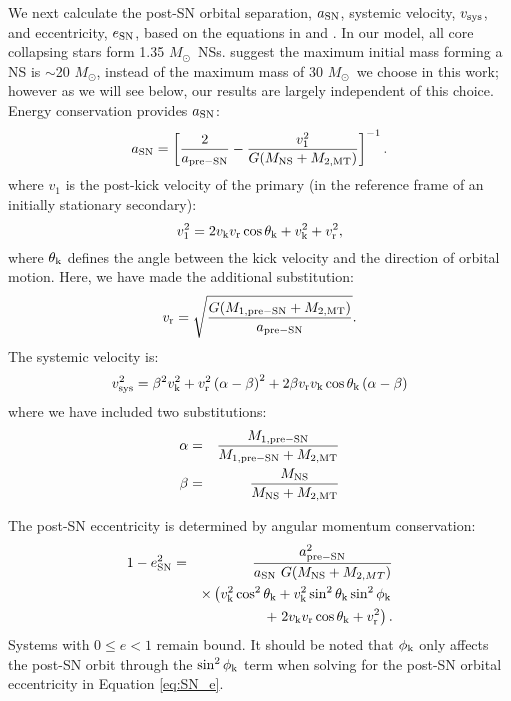 \documentclass[usenatbib]{mnras}
\newcommand{\Msun}{\ifmmode {M_{\odot}}\else${M_{\odot}}$\fi}
\begin{document}
We next calculate the post-SN orbital separation, $a_{\rm SN}$, systemic velocity, $v_{\rm sys}$, and eccentricity, $e_{\rm SN}$, based on the equations in \citet{hills83} and \citet{kalogera96}. In our model, all core collapsing stars form 1.35 \Msun\ NSs. \citet{timmes96} suggest the maximum initial mass forming a NS is $\sim$20 \Msun, instead of the maximum mass of 30 \Msun\ we choose in this work; however as we will see below, our results are largely independent of this choice. Energy conservation provides $a_{\rm SN}$:
\begin{equation}
a_{\rm SN} = \left[ \frac{2 }{a_{\rm pre-SN}}  - \frac{v_1^2}{G(M_{\rm NS} + M_{\rm 2, MT})} \right]^{-1}. \label{eq:SN_A} \\
\end{equation}
where $v_1$ is the post-kick velocity of the primary (in the reference frame of an initially stationary secondary):
\begin{equation}
v_1^2 = 2v_{\rm k} v_{\rm r} \cos \theta_{\rm k} + v_{\rm k}^2 + v_{\rm r}^2, \label{eq:v_1}
\end{equation}
where $\theta_{\rm k}$ defines the angle between the kick velocity and the direction of orbital motion. Here, we have made the additional substitution:
\begin{equation}
v_{\rm r} = \sqrt{\frac{G (M_{\rm 1, pre-SN} + M_{\rm 2, MT})}{a_{\rm pre-SN}}}. \label{eq:v_r}
\end{equation}
The systemic velocity is:
\begin{equation}
v_{\rm sys}^2 = \beta^2 v_{\rm k}^2
   + v_{\rm r}^2 \left( \alpha - \beta \right)^2
   + 2 \beta v_{\rm r} v_{\rm k} \cos \theta_{\rm k} \left( \alpha - \beta \right)
    \label{eq:SN_v_sys}
\end{equation}
where we have included two substitutions:
\begin{eqnarray}
\alpha &=& \frac{M_{\rm 1, pre-SN}}{M_{\rm 1, pre-SN} + M_{\rm 2, MT}} \\
\beta &=& \frac{M_{\rm NS}}{M_{\rm NS} + M_{\rm 2, MT}}
\end{eqnarray}


The post-SN eccentricity is determined by angular momentum conservation:
\begin{eqnarray}
1-e_{\rm SN}^2 &=& \frac{a_{\rm pre-SN}^2}{a_{\rm SN}\ G (M_{\rm NS} + M_{2, MT})} \nonumber \\
 & & \times \left( v_{\rm k}^2 \cos^2\theta_{\rm k} + v_{\rm k}^2 \sin^2 \theta_{\rm k} \sin^2 \phi_{\rm k} \right. \nonumber \\
 & & \qquad + \left. 2 v_{\rm k} v_{\rm r} \cos \theta_{\rm k} + v_{\rm r}^2  \right). \label{eq:SN_e}
\end{eqnarray}
Systems with $0 \leq e < 1$ remain bound. It should be noted that $\phi_{\rm k}$ only affects the post-SN orbit through the $\sin^2 \phi_{\rm k}$ term when solving for the post-SN orbital eccentricity in Equation \ref{eq:SN_e}. 







\label{lastpage}
\end{document}
